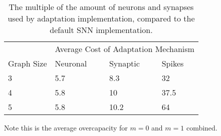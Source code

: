 \begin{table}[H]
\caption{The multiple of the amount of neurons and synapses used by adaptation implementation, compared to the default SNN implementation.}\label{tab:overcapacity}
\begin{tabular}{llll}
           & \multicolumn{3}{l}{Average Cost of Adaptation Mechanism} \\ \cmidrule{2-4}
           Graph Size & Neuronal     & Synaptic & Spikes                   \\ \hline 
3       & 5.7          & 8.3        & 32                \\
4      & 5.8            & 10        & 37.5                  \\
5      & 5.8            & 10.2           & 64              
\end{tabular}
\end{table}
Note this is the average overcapacity for $m=0$ and $m=1$ combined.



